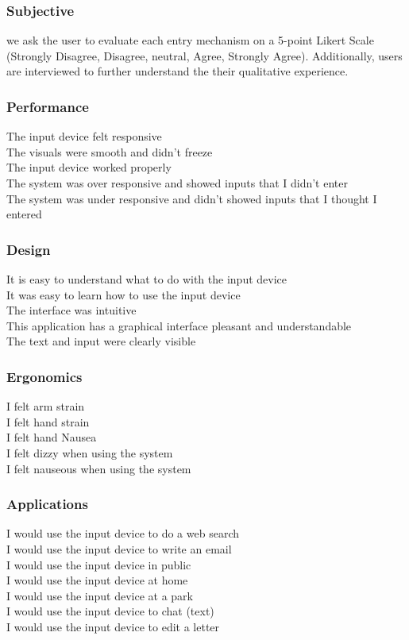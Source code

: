 \subsubsection{Subjective }
we ask the user to evaluate each entry mechanism on a 5-point Likert Scale (Strongly Disagree, Disagree, neutral, Agree, Strongly Agree).
Additionally, users are  interviewed to further understand the their qualitative experience.

\subsubsection{Performance}
The input device felt responsive\\
The visuals were smooth and didn't freeze\\
The input device worked properly\\
The system was over responsive and showed inputs that I didn't enter\\
The system was under responsive and didn't showed inputs that I thought I entered

\subsubsection{Design}
It is easy to understand what to do with the input device\\
It was easy to learn how to use the input device\\
The interface was intuitive\\
This application has a graphical interface pleasant and understandable\\
The text and input were clearly visible

\subsubsection{Ergonomics}
I felt arm strain\\
I felt hand strain\\
I felt hand Nausea\\
I felt dizzy when using the system\\
I felt nauseous when using the system

\subsubsection{Applications}
I would use the input device to do a web search\\
I would use the input device to write an email\\
I would use the input device in public\\
I would use the input device at home\\
I would use the input device at a park\\
I would use the input device to chat (text)\\
I would use the input device to edit a letter

